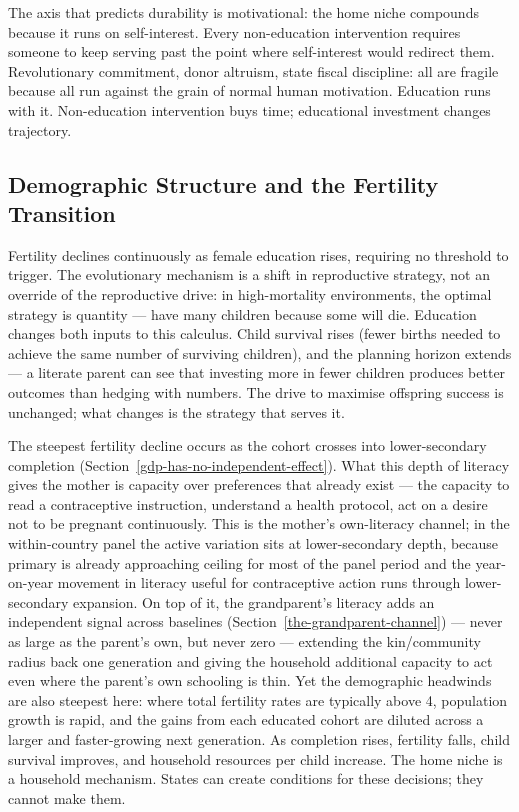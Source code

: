 \documentclass[12pt,letterpaper]{article}
\begin{document}
The axis that predicts durability is motivational: the home niche
compounds because it runs on self-interest. Every non-education intervention requires
someone to keep serving past the point where self-interest would redirect
them. Revolutionary commitment, donor altruism, state fiscal discipline:
all are fragile because all run against the grain of normal human
motivation. Education runs with it. Non-education intervention buys
time; educational investment changes trajectory.

\subsection{Demographic Structure and the Fertility Transition}\label{demographic-structure-and-the-fertility-transition}

Fertility declines continuously as female education rises,
requiring no threshold to trigger. The
evolutionary mechanism is a shift in reproductive
strategy, not an override of the reproductive drive: in high-mortality
environments, the optimal strategy is quantity --- have many children
because some will die. Education changes both inputs to this calculus.
Child survival rises (fewer births needed to achieve the same number of
surviving children), and the planning horizon extends --- a literate
parent can see that investing more in fewer children produces better
outcomes than hedging with numbers. The drive to maximise offspring
success is unchanged; what changes is the strategy that serves it.

The steepest fertility decline occurs as the cohort crosses into
lower-secondary completion
(Section~\ref{gdp-has-no-independent-effect}). What this depth of
literacy gives the mother is capacity over preferences that already
exist --- the capacity to read a contraceptive instruction, understand
a health protocol, act on a desire not to be pregnant continuously.
This is the mother's own-literacy channel; in the within-country
panel the
active variation sits at lower-secondary depth, because primary is
already approaching ceiling for most of the panel period and the
year-on-year movement in literacy useful for contraceptive action runs
through lower-secondary expansion. On top of it, the grandparent's
literacy adds an independent signal across baselines
(Section~\ref{the-grandparent-channel}) --- never as large as the
parent's own, but never zero --- extending the kin/community radius
back one generation and giving the household additional capacity to
act even where the parent's own schooling is thin. Yet the demographic headwinds are also steepest here:
where total fertility rates are typically above 4, population growth is
rapid, and the gains from each educated cohort are diluted across a
larger and faster-growing next generation. As completion rises, fertility
falls, child survival improves, and household resources per child
increase. The home niche is a household mechanism. States can create
conditions for these decisions; they cannot make them.
\end{document}
